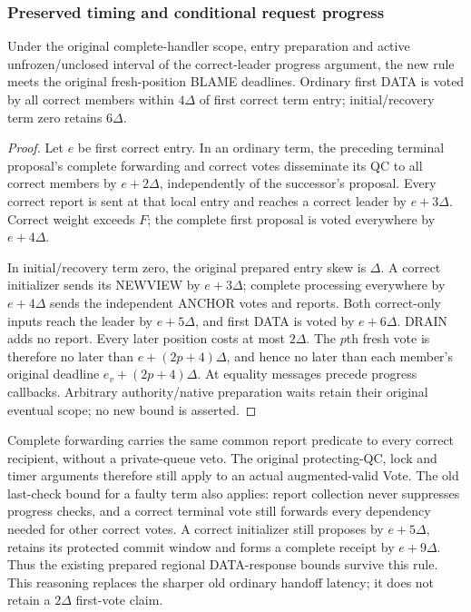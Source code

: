 \subsubsection{Preserved timing and conditional request progress}
\label{sec:input-report-progress}
\begin{proposition}
\label{prop:v38-report-timing}
Under the original complete-handler scope, entry preparation and active
unfrozen/unclosed interval of the correct-leader progress argument, the
new rule meets the original fresh-position BLAME deadlines. Ordinary
first DATA is voted by all correct members within $4\Delta$ of first
correct term entry; initial/recovery term zero retains $6\Delta$.
\end{proposition}
\begin{proof}
Let $e$ be first correct entry. In an ordinary term, the preceding
terminal proposal's complete forwarding and correct votes disseminate
its QC to all correct members by $e+2\Delta$, independently of the
successor's proposal. Every correct report is sent at that local entry
and reaches a correct leader by $e+3\Delta$. Correct weight exceeds $F$;
the complete first proposal is voted everywhere by $e+4\Delta$.

In initial/recovery term zero, the original prepared entry skew is
$\Delta$. A correct initializer sends its NEWVIEW by $e+3\Delta$;
complete processing everywhere by $e+4\Delta$ sends the independent
ANCHOR votes and reports. Both correct-only inputs reach the leader by
$e+5\Delta$, and first DATA is voted by $e+6\Delta$. DRAIN adds no report.
Every later position costs at most $2\Delta$. The $p$th fresh vote is
therefore no later than $e+(2p+4)\Delta$, and hence no later than each
member's original deadline $e_v+(2p+4)\Delta$. At equality messages
precede progress callbacks. Arbitrary authority/native preparation
waits retain their original eventual scope; no new bound is asserted.
\end{proof}

Complete forwarding carries the same common report predicate to every
correct recipient, without a private-queue veto. The original
protecting-QC, lock and timer arguments therefore still apply to an
actual augmented-valid Vote. The old last-check bound for a faulty term
also applies: report collection never suppresses progress checks, and a
correct terminal vote still forwards every dependency needed for other
correct votes. A correct initializer still proposes by $e+5\Delta$,
retains its protected commit window and forms a complete receipt by
$e+9\Delta$. Thus the existing prepared regional DATA-response bounds
survive this rule. This reasoning replaces the sharper old ordinary
handoff latency; it does not retain a $2\Delta$ first-vote claim.

